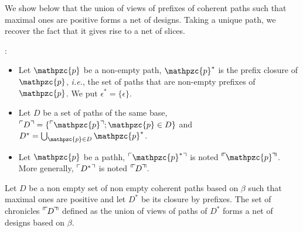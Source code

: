 \documentclass{LMCS}
\def\ie{{\em i.e.}}
\newcommand{\design}[1]{{\mathfrak{#1}}}
\newcommand{\pathLL}[1]{\mathpzc{#1}}\newcommand{\strategy}[1]{\pathLL{#1}}\newcommand{\view}[1]{\raisebox{.3ex}{$\ulcorner$}{#1}\raisebox{.3ex}{$\urcorner$}}\newcommand{\fullview}[1]{\raisebox{.3ex}{$\ulcorner\mkern-6mu\ulcorner\mkern-2mu$}{#1}\raisebox{.3ex}{$\mkern-2mu\urcorner\mkern-6mu\urcorner$}}\newcommand{\views}[1]{\view{#1}}\newcommand{\fullviews}[1]{\fullview{#1}}\newcommand{\shuffle}[1]{\llcorner\design{#1}\lrcorner}\newcommand{\PoD}[1]{{\mathcal{P}}_{#1}}\newcommand{\norm}[1]{\llbracket\design{#1}\rrbracket}
\begin{document}
We show below that the union of views of prefixes of coherent paths such that maximal ones are positive forms a net of designs. Taking a unique path, we recover the fact that it gives rise to a net of slices.\bigskip

:\hfill
\begin{itemize}[label=$-$]
\item Let $\pathLL{p}$ be a non-empty path, $\pathLL{p}^*$ is the prefix closure of $\pathLL{p}$, \ie, the set of paths that are non-empty prefixes of $\pathLL{p}$. We put $\epsilon^* = \{\epsilon\}$.
\item Let $D$ be a set of paths of the same base, $\view{D} = \{\view{\pathLL{p}} ; \pathLL{p} \in D\}$ and $D^* = \bigcup_{\pathLL{p} \in D} \pathLL{p}^*$.
\item Let $\pathLL{p}$ be a pathh, $\view{\pathLL{p}^*}$ is noted
  $\fullview{\pathLL{p}}$. More generally, $\view{D^*}$ is noted
  $\fullview{D}$.
\end{itemize}


\begin{prop}\label{prop:pathsTOnet}
 Let $D$ be a non empty set  of non empty coherent paths based   on   $\beta$
such that maximal ones are positive and let $D^*$ be its closure by prefixes. The set of chronicles $\fullviews{D}$ defined as the union of views of paths of $D^*$ forms a net of designs based on $\beta$. 
  \end{prop} 
\end{document}

